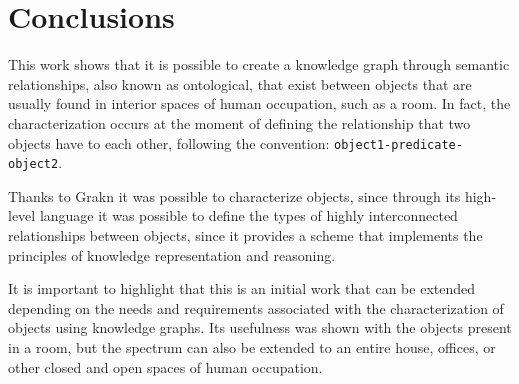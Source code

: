 \section{Conclusions}
This work shows that it is possible to create a knowledge graph through 
semantic relationships, also known as ontological, that exist between objects 
that are usually found in interior spaces of human occupation, such as a room. 
In fact, the characterization occurs at the moment of defining the relationship 
that two objects have to each other, following the convention: 
\texttt{object1-predicate-object2}.

Thanks to Grakn it was possible to characterize objects, since through its 
high-level language it was possible to define the types of highly interconnected 
relationships between objects, since it provides a scheme that implements the 
principles of knowledge representation and reasoning.

It is important to highlight that this is an initial work that can be extended 
depending on the needs and requirements associated with the characterization 
of objects using knowledge graphs. Its usefulness was shown with the objects 
present in a room, but the spectrum can also be extended to an entire house, 
offices, or other closed and open spaces of human occupation.

